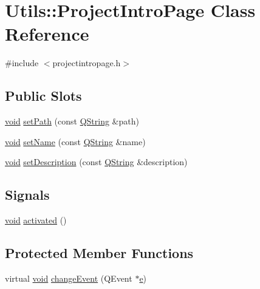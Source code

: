 \hypertarget{class_utils_1_1_project_intro_page}{\section{\-Utils\-:\-:\-Project\-Intro\-Page \-Class \-Reference}
\label{class_utils_1_1_project_intro_page}
}


{\ttfamily \#include $<$projectintropage.\-h$>$}

\subsection*{\-Public \-Slots}
\begin{DoxyCompactItemize}
\item 
\hyperlink{group___u_a_v_objects_plugin_ga444cf2ff3f0ecbe028adce838d373f5c}{void} \hyperlink{class_utils_1_1_project_intro_page_a8197a8b196023554b745d037841fa7d9}{set\-Path} (const \hyperlink{group___u_a_v_objects_plugin_gab9d252f49c333c94a72f97ce3105a32d}{\-Q\-String} \&path)
\item 
\hyperlink{group___u_a_v_objects_plugin_ga444cf2ff3f0ecbe028adce838d373f5c}{void} \hyperlink{class_utils_1_1_project_intro_page_ad9db9a5116385e9f3832d2e19dedc465}{set\-Name} (const \hyperlink{group___u_a_v_objects_plugin_gab9d252f49c333c94a72f97ce3105a32d}{\-Q\-String} \&name)
\item 
\hyperlink{group___u_a_v_objects_plugin_ga444cf2ff3f0ecbe028adce838d373f5c}{void} \hyperlink{class_utils_1_1_project_intro_page_a245a3b785d9fb84b76ed3f3914f87578}{set\-Description} (const \hyperlink{group___u_a_v_objects_plugin_gab9d252f49c333c94a72f97ce3105a32d}{\-Q\-String} \&description)
\end{DoxyCompactItemize}
\subsection*{\-Signals}
\begin{DoxyCompactItemize}
\item 
\hyperlink{group___u_a_v_objects_plugin_ga444cf2ff3f0ecbe028adce838d373f5c}{void} \hyperlink{class_utils_1_1_project_intro_page_a8f3e6160911156b2d04e841f7f1bcf13}{activated} ()
\end{DoxyCompactItemize}
\subsection*{\-Protected \-Member \-Functions}
\begin{DoxyCompactItemize}
\item 
virtual \hyperlink{group___u_a_v_objects_plugin_ga444cf2ff3f0ecbe028adce838d373f5c}{void} \hyperlink{class_utils_1_1_project_intro_page_a5db9a52263e66befc74965a0b07caf59}{change\-Event} (\-Q\-Event $\ast$\hyperlink{_o_p_plots_8m_a9425be9aab51621e317ba7ade564b570}{e})
\end{DoxyCompactItemize}


